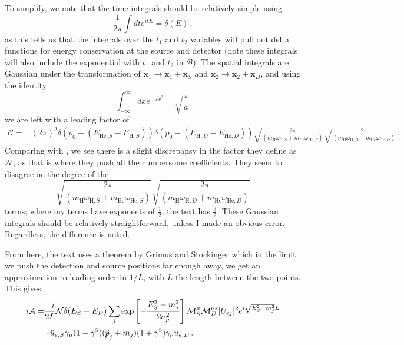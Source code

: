 \documentclass[10pt]{article}
\begin{document}
To simplify, we note that the time integrals should be relatively simple using 
\begin{equation}
  \frac{1}{2\pi}\int dt e^{itE} = \delta(E) \, ,
\end{equation}
as this tells us that the integrals over the $t_{1}$ and $t_{2}$ variables will pull out delta functions for energy conservation at the source and detector (note these integrals will also include the exponential with $t_{1}$ and $t_{2}$ in $\mathcal{B}$). The spatial integrals are Gaussian under the transformation of $\bm{x}_{1} \to \bm{x}_{1} + \bm{x}_{S}$ and $\bm{x}_{2} \to \bm{x}_{2} + \bm{x}_{D}$, and using the identity
\begin{equation}
  \int_{-\infty}^{\infty} dx e^{-ax^{2}} = \sqrt{\frac{\pi}{a}}\,
\end{equation}
we are left with a leading factor of
\begin{align*}
  \mathcal{C} = & (2\pi)^{2}\delta(p_{0} - (E_{\text{He},S} - E_{\text{H},S}))\delta(p_0 - (E_{\text{H},D} - E_{\text{He},D}))\sqrt{\frac{2\pi}{(m_{\text{H}}\omega_{\text{H},S} + m_{\text{He}}\omega_{\text{He},S})}}\sqrt{\frac{2\pi}{(m_{\text{H}}\omega_{\text{H},D} + m_{\text{He}}\omega_{\text{He},D})}}\, .  
\end{align*}
Comparing with \cite{Akhmedov_2008}, we see there is a slight discrepansy in the factor they define as $\mathcal{N}$, as that is where they push all the cumbersome coefficients. They seem to disagree on the degree of the
\[ \sqrt{\frac{2\pi}{(m_{\text{H}}\omega_{\text{H},S} + m_{\text{He}}\omega_{\text{He},S})}}\sqrt{\frac{2\pi}{(m_{\text{H}}\omega_{\text{H},D} + m_{\text{He}}\omega_{\text{He},D})}} \]
terms; where my terms have exponents of $\frac{1}{2}$, the text has $\frac{3}{2}$. These Gaussian integrals should be relatively straightforward, unless I made an obvious error. Regardless, the difference is noted.

From here, the text \cite{Akhmedov_2008} uses a theorem by Grimus and Stockinger \cite{Grim} which in the limit we push the detection and source positions far enough away, we get an approximation to leading order in $1/L$, with $L$ the length between the two points. This gives
\begin{align*}
  i\mathcal{A} = & \frac{-i}{2L}\mathcal{N}\delta(E_{S} - E_{D})\sum_{j}\exp\left[-\frac{E_{S}^{2} - m_{j}^{2}}{2\sigma^{2}_{p}}\right]\mathcal{M}_{S}^{\mu}\mathcal{M}_{D}^{\nu *}|U_{ej}|^{2}e^{i\sqrt{E_{S}^{2} - m_{j}^{2}}L} \\
  & \cdot \bar{u}_{e,S}\gamma_{\mu}(1-\gamma^{5})(\slashed{p}_{j} + m_{j})(1 + \gamma^{5})\gamma_{\nu}u_{e,D}\, .
\end{align*}
\end{document}
